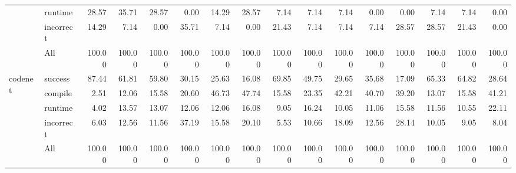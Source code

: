 \begin{tabular}{llrrrrrrrrrrrrrr}
 & runtime & 28.57 & 35.71 & 28.57 & 0.00 & 14.29 & 28.57 & 7.14 & 7.14 & 7.14 & 0.00 & 0.00 & 7.14 & 7.14 & 0.00 \\
 & incorrect & 14.29 & 7.14 & 0.00 & 35.71 & 7.14 & 0.00 & 21.43 & 7.14 & 7.14 & 7.14 & 28.57 & 28.57 & 21.43 & 0.00 \\
 & All & 100.00 & 100.00 & 100.00 & 100.00 & 100.00 & 100.00 & 100.00 & 100.00 & 100.00 & 100.00 & 100.00 & 100.00 & 100.00 & 100.00 \\
\cline{1-16}
\multirow[t]{5}{*}{codenet} & success & 87.44 & 61.81 & 59.80 & 30.15 & 25.63 & 16.08 & 69.85 & 49.75 & 29.65 & 35.68 & 17.09 & 65.33 & 64.82 & 28.64 \\
 & compile & 2.51 & 12.06 & 15.58 & 20.60 & 46.73 & 47.74 & 15.58 & 23.35 & 42.21 & 40.70 & 39.20 & 13.07 & 15.58 & 41.21 \\
 & runtime & 4.02 & 13.57 & 13.07 & 12.06 & 12.06 & 16.08 & 9.05 & 16.24 & 10.05 & 11.06 & 15.58 & 11.56 & 10.55 & 22.11 \\
 & incorrect & 6.03 & 12.56 & 11.56 & 37.19 & 15.58 & 20.10 & 5.53 & 10.66 & 18.09 & 12.56 & 28.14 & 10.05 & 9.05 & 8.04 \\
 & All & 100.00 & 100.00 & 100.00 & 100.00 & 100.00 & 100.00 & 100.00 & 100.00 & 100.00 & 100.00 & 100.00 & 100.00 & 100.00 & 100.00 \\
\cline{1-16}
\bottomrule
\end{tabular}
